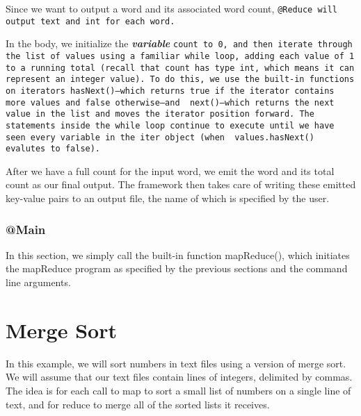 \documentclass{article} \usepackage{fancyhdr, multicol}
\begin{document}
Since we want to output a word and its associated word count, \tt @Reduce \rm will
output \tt text \rm and \tt int \rm for each word.

In the body, we initialize the \textbf{\emph{variable}} \tt count \rm to \tt 0\rm,
and then iterate through the list of values using a familiar \tt while \rm loop,
adding each value of \tt 1 \rm to a running total (recall that \tt count \rm has
type \tt int\rm, which means it can represent an integer value). To do this, we use
the built-in functions on iterators \tt hasNext()\rm---which returns \tt true \rm
if the iterator contains more values and \tt false \rm otherwise---and \tt
next()\rm---which returns the next value in the \tt list \rm and moves the
iterator position forward. The statements inside the \tt while \rm loop continue to
execute until we have seen every variable in the \tt iter \rm object (when \tt
values.hasNext() \rm evalutes to \tt false\rm).

After we have a full count for the input word, we emit the word and its total count
as our final output. The framework then takes care of writing these emitted
key-value pairs to an output file, the name of which is specified by the user.

\subsubsection*{@Main}
In this section, we simply call the built-in function mapReduce(), which initiates the mapReduce program as specified by the previous sections and the command line arguments.


\section*{Merge Sort}
\label{merge_sort}
In this example, we will sort numbers in text files using a version of merge sort. We will assume that our text files contain lines of integers, delimited by commas. The idea is for each call to map to sort a small list of numbers on a single line of text, and for reduce to merge all of the sorted lists it receives.
\end{document}
